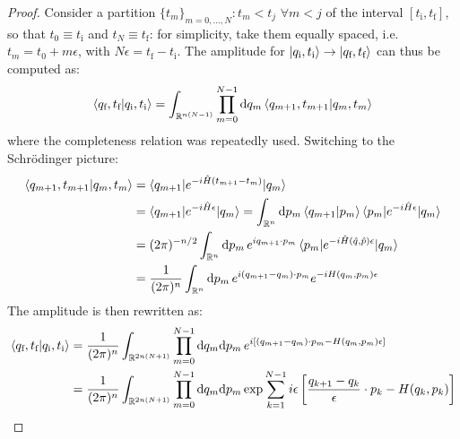 \begin{proofbox}
  \begin{proof}
    Consider a partition $ \{t_m\}_{m = 0, \dots, N} : t_m < t_j \,\,\forall m < j $ of the interval $ [t_\text{i} , t_\text{f}] $, so that $ t_0 \equiv t_\text{i} $ and $ t_N \equiv t_\text{f} $: for simplicity, take them equally spaced, i.e. $ t_m = t_0 + m \epsilon $, with $ N \epsilon = t_\text{f} - t_\text{i} $. The amplitude for $ \ket{q_\text{i},t_\text{i}} \rightarrow \ket{q_\text{f},t_\text{f}} $ can thus be computed as:
    \begin{equation*}
      \begin{split}
        \braket{q_\text{f},t_\text{f} | q_\text{i},t_\text{i}} = \int_{\mathbb{R}^{n(N-1)}} \prod_{m = 0}^{N-1} \mathrm{d} q_m \braket{q_{m+1} , t_{m+1} | q_m , t_m}
      \end{split}
    \end{equation*}
    where the completeness relation was repeatedly used. Switching to the Schrödinger picture:
    \begin{equation*}
      \begin{split}
        \braket{q_{m+1} , t_{m+1} | q_m , t_m}
        & = \braket{q_{m+1} | e^{-i \hat H (t_{m+1} - t_m)} | q_m} \\
        & = \braket{q_{m+1} | e^{-i \hat H \epsilon} | q_m} = \int_{\mathbb{R}^n} \mathrm{d} p_m \braket{q_{m+1} | p_m} \braket{p_m | e^{-i \hat H \epsilon} | q_m} \\
        & = (2\pi)^{-n/2} \int_{\mathbb{R}^n} \mathrm{d} p_m\, e^{i q_{m+1} \cdot p_m} \braket{p_m | e^{-i \hat{H}(\hat{q},\hat{p}) \epsilon} | q_m} \\
        & = \frac{1}{(2\pi)^n} \int_{\mathbb{R}^n} \mathrm{d} p_m\, e^{i (q_{m+1} - q_m) \cdot p_m} e^{-i H(q_m,p_m) \epsilon}
      \end{split}
    \end{equation*}
    The amplitude is then rewritten as:
    \begin{equation*}
      \begin{split}
        \braket{q_\text{f},t_\text{f} | q_\text{i},t_\text{i}}
        & = \frac{1}{(2\pi)^n} \int_{\R^{2n(N+1)}} \prod_{m = 0}^{N-1} \dd q_m \dd p_m\, e^{i \left[ (q_{m+1} - q_m) \cdot p_m - H(q_m,p_m) \epsilon \right]} \\
        & = \frac{1}{(2\pi)^n} \int_{\R^{2n(N+1)}} \prod_{m = 0}^{N-1} \dd q_m \dd p_m \exp \sum_{k = 1}^{N-1} i \epsilon \left[ \frac{q_{k+1} - q_k}{\epsilon} \cdot p_k - H(q_k,p_k) \right] \\
      \end{split}

\end{equation*}
\end{proof}
\end{proofbox}
